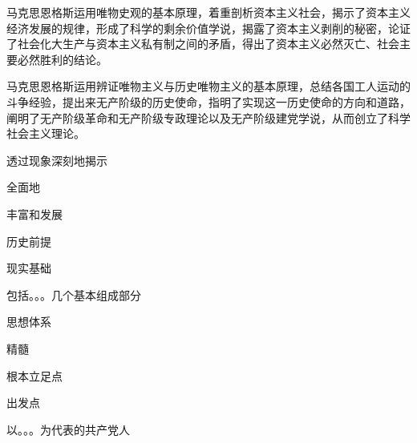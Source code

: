 \documentclass{ctexart}
\begin{document}
马克思恩格斯运用唯物史观的基本原理，着重剖析资本主义社会，揭示了资本主义经济发展的规律，形成了科学的剩余价值学说，揭露了资本主义剥削的秘密，论证了社会化大生产与资本主义私有制之间的矛盾，得出了资本主义必然灭亡、社会主要必然胜利的结论。

马克思恩格斯运用辨证唯物主义与历史唯物主义的基本原理，总结各国工人运动的斗争经验，提出来无产阶级的历史使命，指明了实现这一历史使命的方向和道路，阐明了无产阶级革命和无产阶级专政理论以及无产阶级建党学说，从而创立了科学社会主义理论。


透过现象深刻地揭示

全面地

丰富和发展




历史前提

现实基础

包括。。。几个基本组成部分

思想体系

精髓

根本立足点

出发点

以。。。为代表的共产党人
\end{document}
